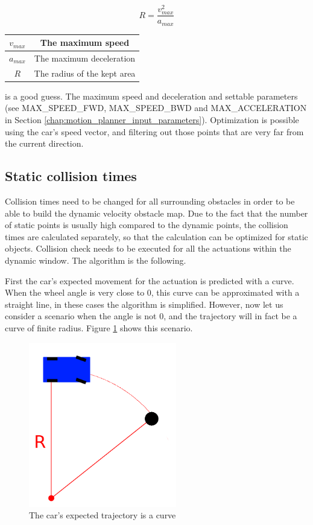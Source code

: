 \begin{equation}\label{eq:static_area}
R = \frac{v_{max}^2}{a_{max}}
\end{equation}

\begin{center}
    \begin{tabular}{ | c | c | }
        \hline
        $v_{max}$    & The maximum speed             \\
        \hline
        $a_{max}$    & The maximum deceleration      \\
        \hline
        $R$          & The radius of the kept area   \\
        \hline
    \end{tabular}
\end{center}

is a good guess. The maximum speed and deceleration and settable parameters (see MAX\_SPEED\_FWD, MAX\_SPEED\_BWD and MAX\_ACCELERATION in Section \ref{chap:motion_planner_input_parameters}). Optimization is possible using the car's speed vector, and filtering out those points that are very far from the current direction.

\subsection{Static collision times}
Collision times need to be changed for all surrounding obstacles in order to be able to build the dynamic velocity obstacle map. Due to the fact that the number of static points is usually high compared to the dynamic points, the collision times are calculated separately, so that the calculation can be optimized for static objects. Collision check needs to be executed for all the actuations within the dynamic window. The algorithm is the following.

First the car's expected movement for the actuation is predicted with a curve. When the wheel angle is very close to 0, this curve can be approximated with a straight line, in these cases the algorithm is simplified. However, now let us consider a scenario when the angle is not 0, and the trajectory will in fact be a curve of finite radius. Figure \ref{static_collision_time_check_objects} shows this scenario.

\begin{figure}[!ht]
    \centering
    \includegraphics[height=72mm]{figures/raw/static_collision_time_check_objects.png}
    \caption{The car's expected trajectory is a curve}
    \label{static_collision_time_check_objects}
\end{figure}

